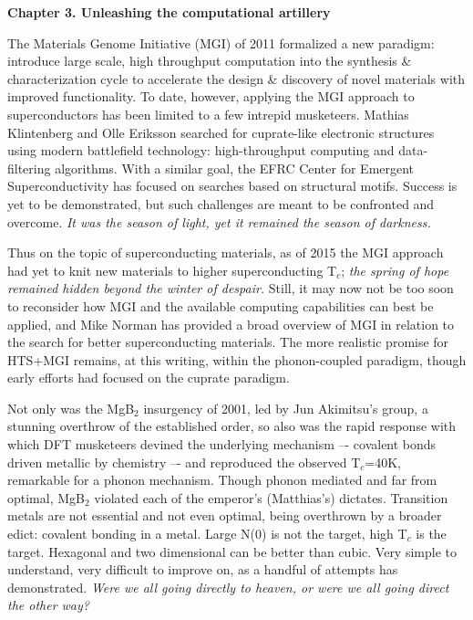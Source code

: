 \documentclass[aps,prb,twocolumn,groupedaddress]{revtex4}
\begin{document}
\begin{center} {\bf Chapter 3. Unleashing the computational artillery}\end{center}

The Materials Genome Initiative 
(MGI) of 2011 formalized a new paradigm: introduce large scale, high throughput 
computation into the synthesis \& characterization cycle to accelerate the design 
\& discovery of novel materials with improved functionality. To date, however, 
applying the MGI approach to superconductors has been limited to a few intrepid 
musketeers. Mathias Klintenberg and Olle Eriksson\cite{Klintenberg} 
searched for cuprate-like electronic 
structures using modern battlefield technology: high-throughput computing and 
data-filtering algorithms. With a similar goal, the EFRC Center for Emergent 
Superconductivity has focused on searches based on structural motifs. Success is 
yet to be demonstrated, but such challenges are meant to be confronted and overcome. 
{\it It was the season of light, yet it remained the season of darkness.}

Thus on the topic of superconducting materials, as of 2015 the MGI approach had yet 
to knit new materials to higher superconducting T$_c$; {\it the spring of 
hope remained hidden beyond the winter of despair.} Still, it may now not be too 
soon to reconsider how MGI and the available computing capabilities can best be 
applied, and Mike Norman has provided a broad overview of MGI in relation to the 
search for better superconducting materials.\cite{Norman}  The more realistic 
promise for HTS+MGI remains, at this writing, within the phonon-coupled paradigm, 
though early efforts\cite{Klintenberg} had focused on the cuprate paradigm. 

Not only was the MgB$_2$ insurgency of 2001, led by 
Jun Akimitsu's group,\cite{MgB2} a stunning 
overthrow of the established order, so also was the rapid response with which DFT 
musketeers devined the underlying mechanism –- covalent bonds driven metallic by 
chemistry –- and reproduced the observed T$_c$=40K, remarkable for a phonon mechanism. 
Though phonon mediated and far from optimal,\cite{Pickett} 
MgB$_2$ violated each of the emperor’s 
(Matthias's) dictates. Transition metals are not essential and not even optimal, 
being overthrown by a 
broader edict: covalent bonding in a metal. Large N(0) is not the target, high 
T$_c$ is the target. Hexagonal and two dimensional can be better than cubic. 
Very simple to understand, very difficult to improve on, as a handful of attempts 
has demonstrated.  {\it Were we all going directly to heaven, or were we all 
going direct the other way?}
\end{document}
